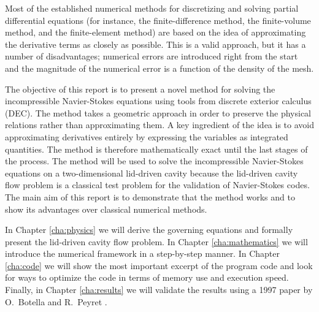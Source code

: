 Most of the established numerical methods for discretizing and solving partial differential equations (for instance, the finite-difference method, the finite-volume method, and the finite-element method) are based on the idea of approximating the derivative terms as closely as possible. This is a valid approach, but it has a number of disadvantages; numerical errors are introduced right from the start and the magnitude of the numerical error is a  function of the density of the mesh.  

The objective of this report is to present a novel method for solving the incompressible Navier-Stokes equations using tools from discrete exterior calculus (DEC). The method takes a geometric approach in order to preserve the physical relations rather than approximating them. A key ingredient of the idea is to avoid approximating derivatives entirely by expressing the variables as integrated quantities. The method is therefore mathematically exact until the last stages of the process. The method will be used to solve the incompressible Navier-Stokes equations on a two-dimensional lid-driven cavity because the lid-driven cavity flow problem is a classical test problem for the validation of Navier-Stokes codes. The main aim of this report is to demonstrate that the method works and to show its advantages over classical numerical methods.

In Chapter \ref{cha:physics} we will derive the governing equations and formally present the lid-driven cavity flow problem. In Chapter \ref{cha:mathematics} we will introduce the numerical framework in a step-by-step manner. In Chapter \ref{cha:code} we will show the most important excerpt of the program code and look for ways to optimize the code in terms of memory use and execution speed. Finally, in Chapter \ref{cha:results} we will validate the results using a 1997 paper by O.~Botella and R.~Peyret \parencite{botella1998benchmark}.